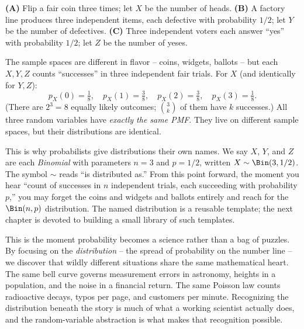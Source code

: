 \begin{example}
\label{ch06:ex-same-dist}
\textbf{(A)} Flip a fair coin three times; let $X$ be the number of heads.
\textbf{(B)} A factory line produces three independent items, each defective with
probability $1/2$; let $Y$ be the number of defectives.
\textbf{(C)} Three independent voters each answer ``yes'' with probability $1/2$; let
$Z$ be the number of yeses.

The sample spaces are different in flavor -- coins, widgets, ballots -- but each
$X,Y,Z$ counts ``successes'' in three independent fair trials. For $X$ (and identically
for $Y,Z$):
\[
  p_X(0) = \tfrac{1}{8},\quad p_X(1) = \tfrac{3}{8},\quad
  p_X(2) = \tfrac{3}{8},\quad p_X(3) = \tfrac{1}{8}.
\]
(There are $2^3 = 8$ equally likely outcomes; $\binom{3}{k}$ of them have $k$
successes.) All three random variables have \emph{exactly the same PMF}. They live on
different sample spaces, but their distributions are identical.
\end{example}

This is why probabilists give distributions their own names. We say $X$, $Y$, and $Z$
are each \emph{Binomial} with parameters $n = 3$ and $p = 1/2$, written
$X \sim \Bin(3, 1/2)$. The symbol $\sim$ reads ``is distributed as.'' From this point
forward, the moment you hear ``count of successes in $n$ independent trials, each
succeeding with probability $p$,'' you may forget the coins and widgets and ballots
entirely and reach for the $\Bin(n,p)$ distribution. The named distribution is a reusable
template; the next chapter is devoted to building a small library of such templates.

\begin{aestheticbox}
This is the moment probability becomes a science rather than a bag of puzzles. By
focusing on the \emph{distribution} -- the spread of probability on the number line --
we discover that wildly different situations share the same mathematical heart. The
same bell curve governs measurement errors in astronomy, heights in a population, and
the noise in a financial return. The same Poisson law counts radioactive decays,
typos per page, and customers per minute. Recognizing the distribution beneath the
story is much of what a working scientist actually does, and the random-variable
abstraction is what makes that recognition possible.
\end{aestheticbox}


